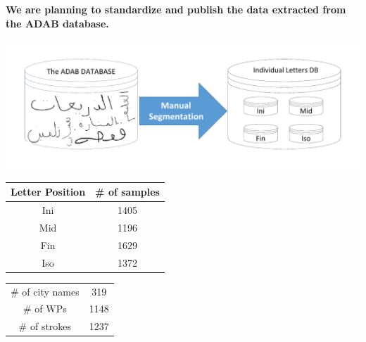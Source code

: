 \documentclass[a0paper,portrait]{baposter}
\begin{document}
\begin{poster}
{\textbf{We are planning to standardize and publish the data extracted from the ADAB database.}

\begin{center}
\includegraphics[width=1\linewidth]{adab_segmentation}
\vspace{-25pt}
\end{center}

\begin{center}
\begin{tabular}{c c}
\toprule
\textbf{Letter Position} & \textbf{\# of samples}\\
\midrule
\rowcolor{IceBlue}
Ini & 1405 \\
\rowcolor{IceBlue2}
Mid & 1196 \\
\rowcolor{IceBlue}
Fin & 1629 \\
\rowcolor{IceBlue2}
Iso & 1372 \\
\bottomrule
\end{tabular}
\end{center}

\begin{center}
\begin{tabular}{ c  c }
  \rowcolor{IceBlue}
  \# of city names & 319 \\
  \rowcolor{IceBlue2}
  \# of WPs & 1148 \\
  \rowcolor{IceBlue}
  \# of strokes & 1237 \\
\end{tabular}
\end{center}
}



\end{poster}
\end{document}

